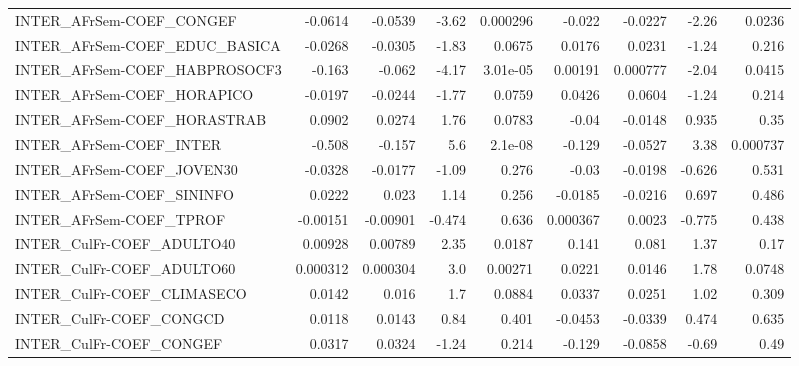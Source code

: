 \begin{tabular}{lrrrrrrrr}
INTER\_AFrSem-COEF\_CONGEF              &     -0.0614 &      -0.0539 &    -3.62 & 0.000296 &     -0.022 &     -0.0227 &        -2.26 &        0.0236 \\
INTER\_AFrSem-COEF\_EDUC\_BASICA         &     -0.0268 &      -0.0305 &    -1.83 &   0.0675 &     0.0176 &      0.0231 &        -1.24 &         0.216 \\
INTER\_AFrSem-COEF\_HABPROSOCF3         &      -0.163 &       -0.062 &    -4.17 & 3.01e-05 &    0.00191 &    0.000777 &        -2.04 &        0.0415 \\
INTER\_AFrSem-COEF\_HORAPICO            &     -0.0197 &      -0.0244 &    -1.77 &   0.0759 &     0.0426 &      0.0604 &        -1.24 &         0.214 \\
INTER\_AFrSem-COEF\_HORASTRAB           &      0.0902 &       0.0274 &     1.76 &   0.0783 &      -0.04 &     -0.0148 &        0.935 &          0.35 \\
INTER\_AFrSem-COEF\_INTER               &      -0.508 &       -0.157 &      5.6 &  2.1e-08 &     -0.129 &     -0.0527 &         3.38 &      0.000737 \\
INTER\_AFrSem-COEF\_JOVEN30             &     -0.0328 &      -0.0177 &    -1.09 &    0.276 &      -0.03 &     -0.0198 &       -0.626 &         0.531 \\
INTER\_AFrSem-COEF\_SININFO             &      0.0222 &        0.023 &     1.14 &    0.256 &    -0.0185 &     -0.0216 &        0.697 &         0.486 \\
INTER\_AFrSem-COEF\_TPROF               &    -0.00151 &     -0.00901 &   -0.474 &    0.636 &   0.000367 &      0.0023 &       -0.775 &         0.438 \\
INTER\_CulFr-COEF\_ADULTO40             &     0.00928 &      0.00789 &     2.35 &   0.0187 &      0.141 &       0.081 &         1.37 &          0.17 \\
INTER\_CulFr-COEF\_ADULTO60             &    0.000312 &     0.000304 &      3.0 &  0.00271 &     0.0221 &      0.0146 &         1.78 &        0.0748 \\
INTER\_CulFr-COEF\_CLIMASECO            &      0.0142 &        0.016 &      1.7 &   0.0884 &     0.0337 &      0.0251 &         1.02 &         0.309 \\
INTER\_CulFr-COEF\_CONGCD               &      0.0118 &       0.0143 &     0.84 &    0.401 &    -0.0453 &     -0.0339 &        0.474 &         0.635 \\
INTER\_CulFr-COEF\_CONGEF               &      0.0317 &       0.0324 &    -1.24 &    0.214 &     -0.129 &     -0.0858 &        -0.69 &          0.49 \\

\end{tabular}
